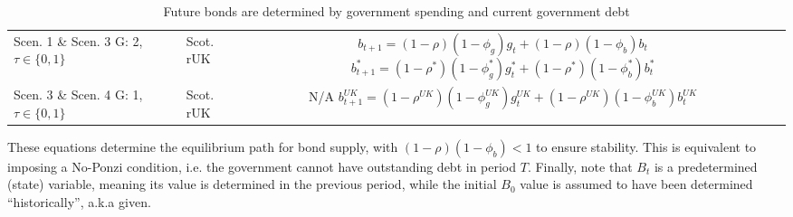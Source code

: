 \begin{table}[H]
    \renewcommand{\arraystretch}{2}
    \centering
    \begin{tabular}{l|l|c}
    \makecell{Scen. 1 \& Scen. 3\\ G: 2, $\tau \in \{0, 1\}$} & \makecell{Scot. \\ rUK } & 
        \makecell{
            $b_{t+1} = (1-\rho)(1-\phi_g) g_t + (1-\rho)(1-\phi_b)b_t$\\
            $b^*_{t+1} = (1-\rho^*)(1-\phi^*_g) g^*_t + (1-\rho^*)(1-\phi^*_b)b^*_t$
        }  \\ 
    \makecell{Scen. 3 \& Scen. 4\\ G: 1, $\tau \in \{0, 1\}$} & \makecell{Scot. \\ rUK } & 
        \makecell{
            N/A\\
            $b^{UK}_{t+1} = (1-\rho^{UK})(1-\phi^{UK}_g) g^{UK}_t + (1-\rho^{UK})(1-\phi^{UK}_b)b^{UK}_t$
        }   
    \end{tabular}
    \caption{Future bonds are determined by government spending and current government debt}
\end{table}
These equations determine the equilibrium path for bond supply, with \linebreak $(1-\rho)(1-\phi_b) < 1$ to ensure stability. This is equivalent to imposing a No-Ponzi condition, i.e. the government cannot have outstanding debt in period $T$. Finally, note that $B_t$ is a predetermined (state) variable, meaning its value is determined in the previous period, while the initial $B_0$ value is assumed to have been determined ``historically'', a.k.a given.